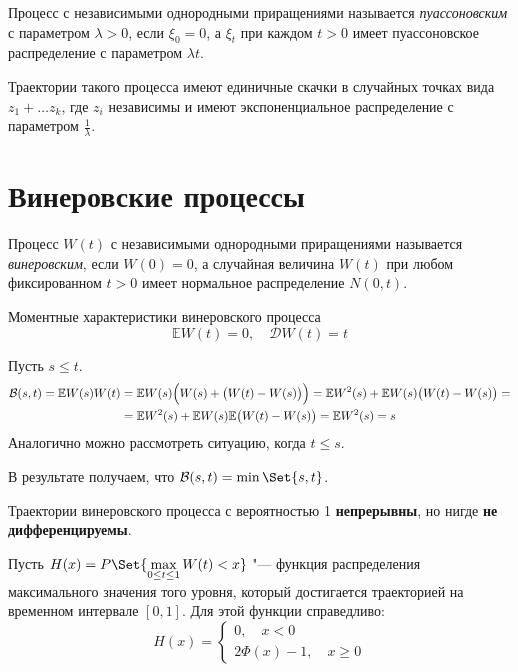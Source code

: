 \begin{definition}
    Процесс с независимыми однородными приращениями называется \emph{пуассоновским} с параметром
    $ \lambda > 0 $, если $ \xi_0 = 0 $, а $ \xi_t $ при каждом $ t > 0 $ имеет пуассоновское
    распределение с параметром $ \lambda t $.
\end{definition}

Траектории такого процесса имеют единичные скачки в случайных точках вида $ z_1 + \dots z_k $, где
$ z_i $ независимы и имеют экспоненциальное распределение с параметром $ \frac1\lambda $.

\section{Винеровские процессы}

\begin{definition}
    Процесс $ W(t) $ с независимыми однородными приращениями называется \emph{винеровским},
    если $ W(0) = 0 $, а случайная величина $ W(t) $ при любом фиксированном $ t > 0 $ имеет
    нормальное распределение $ N(0, t) $.
\end{definition}

\begin{undefthm}{Моментные характеристики винеровского процесса}
    $$ \mathbb E W(t) = 0, \quad \mathcal D W(t) = t $$

    Пусть $ s \le t $.
    \begin{multline*}
        \mathcal B(s, t) = \mathbb EW(s)W(t) = \mathbb E W(s) \Bigl( W(s) + \bigl( W(t) -
        W(s) \bigr) \Bigr) = \mathbb EW^2(s) + \mathbb EW(s) \bigl( W(t) - W(s) \bigr) = \\
        = \mathbb EW^2(s) + \mathbb EW(s) \mathbb E \bigl( W(t) - W(s) \bigr) = \mathbb EW^2(s) = s
    \end{multline*}
    Аналогично можно рассмотреть ситуацию, когда $ t \le s $.

    В результате получаем, что $ \mathcal B(s, t) = \min\Set{s, t} $.
\end{undefthm}

\begin{property}
    Траектории винеровского процесса с вероятностью 1 \textbf{непрерывны}, но нигде \textbf{не
    дифференцируемы}.
\end{property}

Пусть $ H(x) = P\Set{\max\limits_{0 \le t \le 1} W(t) < x} $ "--- функция распределения
максимального значения того уровня, который достигается траекторией на временном интервале
$ [0, 1] $.
Для этой функции справедливо:
$$ H(x) =
\begin{cases}
    0, \quad x < 0 \\
    2\Phi(x) - 1, \quad x \ge 0
\end{cases} $$
